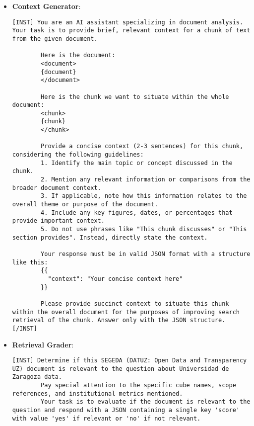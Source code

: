 \begin{itemize}
\begin{lstlisting}[breaklines=true,basicstyle=\small\ttfamily]
                Question: {question}
                Context: {context} [/INST]
    \end{lstlisting}

    \item \textbf{Context Generator}:
    \begin{lstlisting}[breaklines=true,basicstyle=\small\ttfamily]
[INST] You are an AI assistant specializing in document analysis. Your task is to provide brief, relevant context for a chunk of text from the given document.
        
        Here is the document:
        <document>
        {document}
        </document>

        Here is the chunk we want to situate within the whole document:
        <chunk>
        {chunk}
        </chunk>

        Provide a concise context (2-3 sentences) for this chunk, considering the following guidelines:
        1. Identify the main topic or concept discussed in the chunk.
        2. Mention any relevant information or comparisons from the broader document context.
        3. If applicable, note how this information relates to the overall theme or purpose of the document.
        4. Include any key figures, dates, or percentages that provide important context.
        5. Do not use phrases like "This chunk discusses" or "This section provides". Instead, directly state the context.

        Your response must be in valid JSON format with a structure like this:
        {{
          "context": "Your concise context here"
        }}

        Please provide succinct context to situate this chunk within the overall document for the purposes of improving search retrieval of the chunk. Answer only with the JSON structure. [/INST]
    \end{lstlisting}

    \item \textbf{Retrieval Grader}:
    \begin{lstlisting}[breaklines=true,basicstyle=\small\ttfamily]
[INST] Determine if this SEGEDA (DATUZ: Open Data and Transparency UZ) document is relevant to the question about Universidad de Zaragoza data.
        Pay special attention to the specific cube names, scope references, and institutional metrics mentioned.
        Your task is to evaluate if the document is relevant to the question and respond with a JSON containing a single key 'score' with value 'yes' if relevant or 'no' if not relevant.
        

\end{lstlisting}
\end{itemize}
